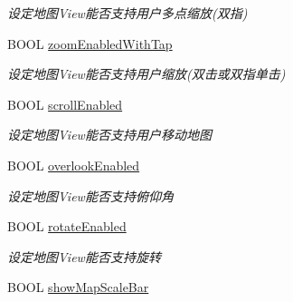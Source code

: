\begin{DoxyCompactItemize}
\begin{DoxyCompactList}\small\item\em 设定地图\+View能否支持用户多点缩放(双指) \end{DoxyCompactList}\item 
\hypertarget{interface_b_m_k_map_view_a11368ac9a8b66b2bc1c3e552e368939e}{}B\+O\+O\+L \hyperlink{interface_b_m_k_map_view_a11368ac9a8b66b2bc1c3e552e368939e}{zoom\+Enabled\+With\+Tap}\label{interface_b_m_k_map_view_a11368ac9a8b66b2bc1c3e552e368939e}

\begin{DoxyCompactList}\small\item\em 设定地图\+View能否支持用户缩放(双击或双指单击) \end{DoxyCompactList}\item 
\hypertarget{interface_b_m_k_map_view_adc7ae3120b0edf096ac0eb42f13ed93a}{}B\+O\+O\+L \hyperlink{interface_b_m_k_map_view_adc7ae3120b0edf096ac0eb42f13ed93a}{scroll\+Enabled}\label{interface_b_m_k_map_view_adc7ae3120b0edf096ac0eb42f13ed93a}

\begin{DoxyCompactList}\small\item\em 设定地图\+View能否支持用户移动地图 \end{DoxyCompactList}\item 
\hypertarget{interface_b_m_k_map_view_a8ab1315eb7dadb7db33f2ac568340dec}{}B\+O\+O\+L \hyperlink{interface_b_m_k_map_view_a8ab1315eb7dadb7db33f2ac568340dec}{overlook\+Enabled}\label{interface_b_m_k_map_view_a8ab1315eb7dadb7db33f2ac568340dec}

\begin{DoxyCompactList}\small\item\em 设定地图\+View能否支持俯仰角 \end{DoxyCompactList}\item 
\hypertarget{interface_b_m_k_map_view_acfd7b4dc9bb05e46ffe477b527c61ce0}{}B\+O\+O\+L \hyperlink{interface_b_m_k_map_view_acfd7b4dc9bb05e46ffe477b527c61ce0}{rotate\+Enabled}\label{interface_b_m_k_map_view_acfd7b4dc9bb05e46ffe477b527c61ce0}

\begin{DoxyCompactList}\small\item\em 设定地图\+View能否支持旋转 \end{DoxyCompactList}\item 
\hypertarget{interface_b_m_k_map_view_ad8768aef899c970e88a4cba6f4f7a1bd}{}B\+O\+O\+L \hyperlink{interface_b_m_k_map_view_ad8768aef899c970e88a4cba6f4f7a1bd}{show\+Map\+Scale\+Bar}\label{interface_b_m_k_map_view_ad8768aef899c970e88a4cba6f4f7a1bd}


\end{DoxyCompactItemize}
